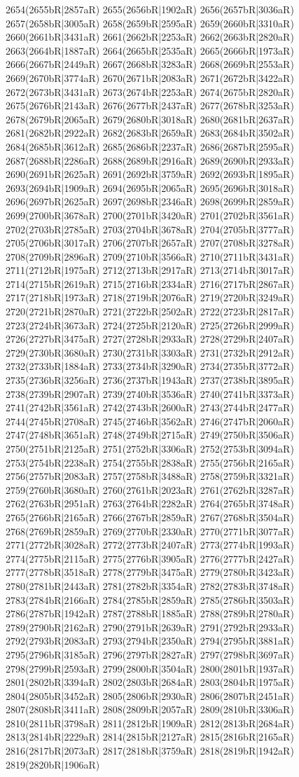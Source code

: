2654(2655bR|2857aR) 2655(2656bR|1902aR) 2656(2657bR|3036aR) 2657(2658bR|3005aR) 2658(2659bR|2595aR) 2659(2660bR|3310aR) 2660(2661bR|3431aR) 2661(2662bR|2253aR) 2662(2663bR|2820aR) 2663(2664bR|1887aR) 2664(2665bR|2535aR) 2665(2666bR|1973aR) 2666(2667bR|2449aR) 2667(2668bR|3283aR) 2668(2669bR|2553aR) 2669(2670bR|3774aR) 2670(2671bR|2083aR) 2671(2672bR|3422aR) 2672(2673bR|3431aR) 2673(2674bR|2253aR) 2674(2675bR|2820aR) 2675(2676bR|2143aR) 2676(2677bR|2437aR) 2677(2678bR|3253aR) 2678(2679bR|2065aR) 2679(2680bR|3018aR) 2680(2681bR|2637aR) 2681(2682bR|2922aR) 2682(2683bR|2659aR) 2683(2684bR|3502aR) 2684(2685bR|3612aR) 2685(2686bR|2237aR) 2686(2687bR|2595aR) 2687(2688bR|2286aR) 2688(2689bR|2916aR) 2689(2690bR|2933aR) 2690(2691bR|2625aR) 2691(2692bR|3759aR) 2692(2693bR|1895aR) 2693(2694bR|1909aR) 2694(2695bR|2065aR) 2695(2696bR|3018aR) 2696(2697bR|2625aR) 2697(2698bR|2346aR) 2698(2699bR|2859aR) 2699(2700bR|3678aR) 2700(2701bR|3420aR) 2701(2702bR|3561aR) 2702(2703bR|2785aR) 2703(2704bR|3678aR) 2704(2705bR|3777aR) 2705(2706bR|3017aR) 2706(2707bR|2657aR) 2707(2708bR|3278aR) 2708(2709bR|2896aR) 2709(2710bR|3566aR) 2710(2711bR|3431aR) 2711(2712bR|1975aR) 2712(2713bR|2917aR) 2713(2714bR|3017aR) 2714(2715bR|2619aR) 2715(2716bR|2334aR) 2716(2717bR|2867aR) 2717(2718bR|1973aR) 2718(2719bR|2076aR) 2719(2720bR|3249aR) 2720(2721bR|2870aR) 2721(2722bR|2502aR) 2722(2723bR|2817aR) 2723(2724bR|3673aR) 2724(2725bR|2120aR) 2725(2726bR|2999aR) 2726(2727bR|3475aR) 2727(2728bR|2933aR) 2728(2729bR|2407aR) 2729(2730bR|3680aR) 2730(2731bR|3303aR) 2731(2732bR|2912aR) 2732(2733bR|1884aR) 2733(2734bR|3290aR) 2734(2735bR|3772aR) 2735(2736bR|3256aR) 2736(2737bR|1943aR) 2737(2738bR|3895aR) 2738(2739bR|2907aR) 2739(2740bR|3536aR) 2740(2741bR|3373aR) 2741(2742bR|3561aR) 2742(2743bR|2600aR) 2743(2744bR|2477aR) 2744(2745bR|2708aR) 2745(2746bR|3562aR) 2746(2747bR|2060aR) 2747(2748bR|3651aR) 2748(2749bR|2715aR) 2749(2750bR|3506aR) 2750(2751bR|2125aR) 2751(2752bR|3306aR) 2752(2753bR|3094aR) 2753(2754bR|2238aR) 2754(2755bR|2838aR) 2755(2756bR|2165aR) 2756(2757bR|2083aR) 2757(2758bR|3488aR) 2758(2759bR|3321aR) 2759(2760bR|3680aR) 2760(2761bR|2023aR) 2761(2762bR|3287aR) 2762(2763bR|2951aR) 2763(2764bR|2282aR) 2764(2765bR|3748aR) 2765(2766bR|2165aR) 2766(2767bR|2859aR) 2767(2768bR|3504aR) 2768(2769bR|2859aR) 2769(2770bR|2330aR) 2770(2771bR|3077aR) 2771(2772bR|3028aR) 2772(2773bR|2407aR) 2773(2774bR|1993aR) 2774(2775bR|2115aR) 2775(2776bR|3905aR) 2776(2777bR|2427aR) 2777(2778bR|3518aR) 2778(2779bR|3475aR) 2779(2780bR|3423aR) 2780(2781bR|2443aR) 2781(2782bR|3354aR) 2782(2783bR|3748aR) 2783(2784bR|2166aR) 2784(2785bR|2859aR) 2785(2786bR|3503aR) 2786(2787bR|1942aR) 2787(2788bR|1885aR) 2788(2789bR|2780aR) 2789(2790bR|2162aR) 2790(2791bR|2639aR) 2791(2792bR|2933aR) 2792(2793bR|2083aR) 2793(2794bR|2350aR) 2794(2795bR|3881aR) 2795(2796bR|3185aR) 2796(2797bR|2827aR) 2797(2798bR|3697aR) 2798(2799bR|2593aR) 2799(2800bR|3504aR) 2800(2801bR|1937aR) 2801(2802bR|3394aR) 2802(2803bR|2684aR) 2803(2804bR|1975aR) 2804(2805bR|3452aR) 2805(2806bR|2930aR) 2806(2807bR|2451aR) 2807(2808bR|3411aR) 2808(2809bR|2057aR) 2809(2810bR|3306aR) 2810(2811bR|3798aR) 2811(2812bR|1909aR) 2812(2813bR|2684aR) 2813(2814bR|2229aR) 2814(2815bR|2127aR) 2815(2816bR|2165aR) 2816(2817bR|2073aR) 2817(2818bR|3759aR) 2818(2819bR|1942aR) 2819(2820bR|1906aR) 